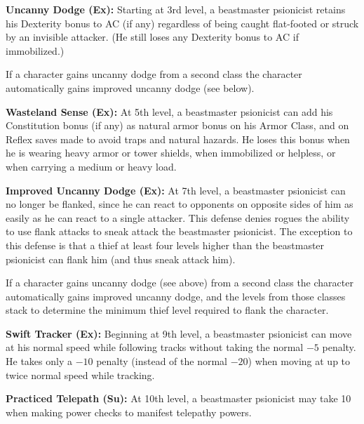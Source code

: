 {\textbf{Uncanny Dodge (Ex):} Starting at 3rd level, a beastmaster psionicist retains his Dexterity bonus to AC (if any) regardless of being caught flat-footed or struck by an invisible attacker. (He still loses any Dexterity bonus to AC if immobilized.)

If a character gains uncanny dodge from a second class the character automatically gains improved uncanny dodge (see below).

\textbf{Wasteland Sense (Ex):} At 5th level, a beastmaster psionicist can add his Constitution bonus (if any) as natural armor bonus on his Armor Class, and on Reflex saves made to avoid traps and natural hazards. He loses this bonus when he is wearing heavy armor or tower shields, when immobilized or helpless, or when carrying a medium or heavy load.

\textbf{Improved Uncanny Dodge (Ex):} At 7th level, a beastmaster psionicist can no longer be flanked, since he can react to opponents on opposite sides of him as easily as he can react to a single attacker. This defense denies rogues the ability to use flank attacks to sneak attack the beastmaster psionicist. The exception to this defense is that a thief at least four levels higher than the beastmaster psionicist can flank him (and thus sneak attack him).

If a character gains uncanny dodge (see above) from a second class the character automatically gains improved uncanny dodge, and the levels from those classes stack to determine the minimum thief level required to flank the character.

\textbf{Swift Tracker (Ex):} Beginning at 9th level, a beastmaster psionicist can move at his normal speed while following tracks without taking the normal $-5$ penalty. He takes only a $-10$ penalty (instead of the normal $-20$) when moving at up to twice normal speed while tracking.

\textbf{Practiced Telepath (Su):} At 10th level, a beastmaster psionicist may take 10 when making power checks to manifest telepathy powers.
}
